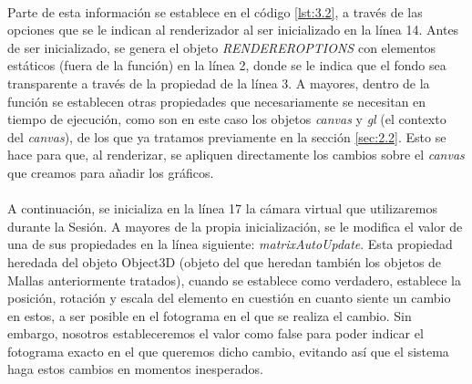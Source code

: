 \documentclass{subfiles}
\begin{document}
        \paragraph{}
        Parte de esta información se establece en el código \ref{lst:3.2}, a través de las opciones que se le indican al renderizador al ser inicializado en la línea 14. Antes de ser inicializado, se genera el objeto \textit{RENDEREROPTIONS} con elementos estáticos (fuera de la función) en la línea 2, donde se le indica que el fondo sea transparente a través de la propiedad de la línea 3. A mayores, dentro de la función se establecen otras propiedades que necesariamente se necesitan en tiempo de ejecución, como son en este caso los objetos \textit{canvas} y \textit{gl} (el contexto del \textit{canvas}), de los que ya tratamos previamente en la sección \ref{sec:2.2}. Esto se hace para que, al renderizar, se apliquen directamente los cambios sobre el \textit{canvas} que creamos para añadir los gráficos.

        \paragraph{}
        A continuación, se inicializa en la línea 17 la cámara virtual que utilizaremos durante la Sesión. A mayores de la propia inicialización, se le modifica el valor de una de sus propiedades en la línea siguiente: \textit{matrixAutoUpdate}. Esta propiedad heredada del objeto Object3D (objeto del que heredan también los objetos de Mallas anteriormente tratados), cuando se establece como verdadero, establece la posición, rotación y escala del elemento en cuestión en cuanto siente un cambio en estos, a ser posible en el fotograma en el que se realiza el cambio. Sin embargo, nosotros estableceremos el valor como false para poder indicar el fotograma exacto en el que queremos dicho cambio, evitando así que el sistema haga estos cambios en momentos inesperados.
        
\end{document}
